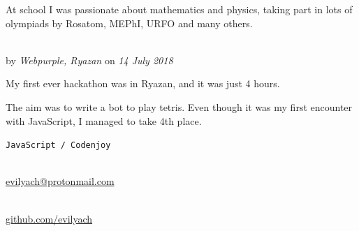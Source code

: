 At school I was passionate about mathematics and physics, taking part in lots of olympiads by Rosatom, MEPhI, URFO and many others.

\Sep


 \\
by \textit{Webpurple, Ryazan}
on \textit{14 July 2018}
\SmallSep

My first ever hackathon was in Ryazan, and it was just 4 hours.

The aim was to write a bot to play tetris. Even though it was my first encounter with JavaScript, I managed to take 4th place.
\SmallSep

\texttt{JavaScript / Codenjoy}

\Sep


 \\
\url{evilyach@protonmail.com}

 \\
\url{github.com/evilyach}

\SmallSep